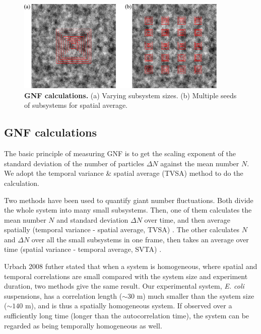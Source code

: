 \begin{figure}[!]
\begin{center}
\includegraphics[width=0.9\textwidth]{figs/5-GNF/GNF-calculations.pdf}
\caption[GNF calculations]
{
\textbf{GNF calculations.}
(a) Varying subsystem sizes.
(b) Multiple seeds of subsystems for spatial average.
}
\label{GNF-calculation}
\end{center}
\end{figure}

\subsection{GNF calculations}

The basic principle of measuring GNF is to get the scaling exponent of the standard deviation of the number of particles $\Delta N$ against the mean number $N$. We adopt the temporal variance \& spatial average (TVSA) method to do the calculation.

Two methods have been used to quantify giant number fluctuations. Both divide the whole system into many small subsystems. Then, one of them calculates the mean number $N$ and standard deviation $\Delta N$ over time, and then average spatially (temporal variance -\> spatial average, TVSA) \cite{Narayan2007}. The other calculates $N$ and $\Delta N$ over all the small subsystems in one frame, then takes an average over time (spatial variance -\> temporal average, SVTA) \cite{Aranson2008}.

Urbach 2008 futher stated that when a system is homogeneous, where spatial and temporal correlations are small compared with the system size and experiment duration, two methods give the same result. Our experimental system, \textit{E. coli} suspensions, has a correlation length ($\sim 30$ \textmu m) much smaller than the system size ($\sim 140$ \textmu m), and is thus a spatially homogeneous system. If observed over a sufficiently long time (longer than the autocorrelation time), the system can be regarded as being temporally homogeneous as well.

